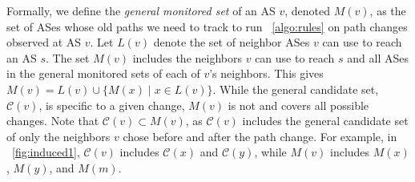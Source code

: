 Formally, we define the \emph{general monitored set} of an AS $v$,
denoted $M(v)$, as the set of ASes whose old paths we need to track to
run \algstr~\ref{algo:rules} on path changes observed at AS $v$.  Let
$L(v)$ denote the set of neighbor ASes $v$ can use to reach an AS $s$.
The set $M(v)$ includes the neighbors $v$ can use to reach $s$ and all
ASes in the general monitored sets of each of $v$'s neighbors.  This
gives $M(v) = L(v) \cup \{M(x) \mid x \in L(v)\}$.  While the general candidate set, 
$\mathcal{C}(v)$, is specific to a given change, $M(v)$ is not and covers
all possible changes. Note that $\mathcal{C}(v) \subset M(v)$, as $\mathcal{C}(v)$ includes the general candidate set of
only the neighbors $v$ chose before and after the path change. For
example, in \fig~\ref{fig:induced1}, $\mathcal{C}(v)$ includes
$\mathcal{C}(x)$ and $\mathcal{C}(y)$, while
$M(v)$ includes $M(x)$, $M(y)$, and $M(m)$.


